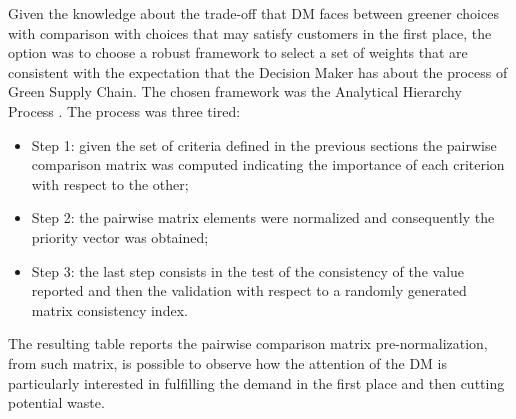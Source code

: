 \begin{doublespace}
Given the knowledge about the trade-off that DM faces between greener choices with comparison with choices that may satisfy customers in the first place, the option was to choose a robust framework to select a set of weights that are consistent with the expectation that the Decision Maker has about the process of Green Supply Chain. The chosen framework was the Analytical Hierarchy Process \cite{Saaty1980}. The process was three tired:
\begin{itemize}
    \item Step 1: given the set of criteria defined in the previous sections the pairwise comparison matrix was computed indicating the importance of each criterion with respect to the other;
    \item Step 2: the pairwise matrix elements were normalized and consequently the priority vector was obtained;
    \item Step 3: the last step consists in the test of the consistency of the value reported and then the validation with respect to a randomly generated matrix consistency index.
\end{itemize}
The resulting table reports the pairwise comparison matrix pre-normalization, from such matrix, is possible to observe how the attention of the DM is particularly interested in fulfilling the demand in the first place and then cutting potential waste.


\end{doublespace}
